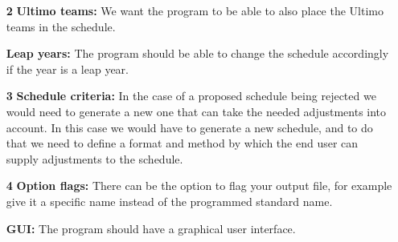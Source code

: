 \begin{itemize}
    \item[\textbf{2}] \textbf{Ultimo teams:} We want the program to be able to also place the Ultimo teams in the schedule.
    
    \item[] \textbf{Leap years:} The program should be able to change the schedule accordingly if the year is a leap year.
    
    \item[\textbf{3}] \textbf{Schedule criteria:} In the case of a proposed schedule being rejected we would need to generate a new one that can take the needed adjustments into account. In this case we would have to generate a new schedule, and to do that we need to define a format and method by which the end user can supply adjustments to the schedule.
    
    \item[\textbf{4}] \textbf{Option flags:} There can be the option to flag your output file, for example give it a specific name instead of the programmed standard name.
    
    \item[] \textbf{GUI:} The program should have a graphical user interface.
    
\end{itemize}


